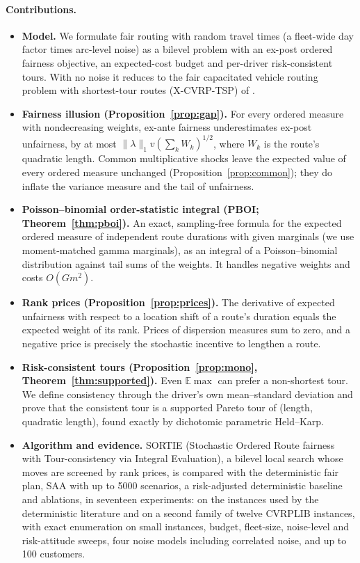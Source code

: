\documentclass[11pt]{article}
\theoremstyle{definition}
\newcommand{\E}{\mathbb{E}}
\begin{document}
\paragraph{Contributions.}
\begin{itemize}
\item \textbf{Model.} We formulate fair routing with random travel times
(a fleet-wide day factor times arc-level noise) as a bilevel problem with an
ex-post ordered fairness objective, an expected-cost budget and per-driver
risk-consistent tours. With no noise it reduces to the fair capacitated vehicle routing problem with
shortest-tour routes (X-CVRP-TSP) of \citet{ljubic2026fair}.
\item \textbf{Fairness illusion (Proposition~\ref{prop:gap}).} For every
ordered measure with nondecreasing weights, ex-ante fairness underestimates
ex-post unfairness, by at most $\|\lambda\|_1 v (\sum_k W_k)^{1/2}$, where
$W_k$ is the route's quadratic length. Common multiplicative shocks leave the
expected value of every ordered measure unchanged
(Proposition~\ref{prop:common}); they do inflate the variance measure and the
tail of unfairness.
\item \textbf{Poisson--binomial order-statistic integral (PBOI;
Theorem~\ref{thm:pboi}).} An exact, sampling-free formula for
the expected ordered measure of independent route durations with given
marginals (we use moment-matched gamma marginals), as an integral
of a Poisson--binomial distribution against tail sums of the weights. It
handles negative weights and costs $O(Gm^2)$.
\item \textbf{Rank prices (Proposition~\ref{prop:prices}).} The derivative of expected
unfairness with respect to a location shift of a route's duration equals the
expected weight of its rank. Prices of dispersion measures sum to zero, and a negative price is
precisely the stochastic incentive to lengthen a route.
\item \textbf{Risk-consistent tours (Proposition~\ref{prop:mono}, Theorem~\ref{thm:supported}).}
Even $\E\max$ can prefer a non-shortest tour. We define consistency through the
driver's own mean--standard deviation and prove that the consistent tour is a
supported Pareto tour of (length, quadratic length), found exactly by
dichotomic parametric Held--Karp.
\item \textbf{Algorithm and evidence.} SORTIE (Stochastic Ordered Route
fairness with Tour-consistency via Integral Evaluation), a bilevel local
search whose
moves are screened by rank prices, is compared with the deterministic fair plan,
SAA with up to 5000 scenarios, a risk-adjusted deterministic baseline and
ablations, in seventeen experiments: on the instances used by the
deterministic literature and on a second family of twelve CVRPLIB instances,
with exact enumeration on small instances, budget, fleet-size, noise-level
and risk-attitude sweeps, four noise models including correlated noise, and
up to 100 customers.
\end{itemize}
\end{document}
